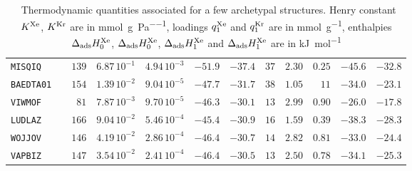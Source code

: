 \documentclass[main.tex]{subfiles}
\begin{document}
\begin{table}[hb]
\begin{tabular}{|lr|rrrrr|rrrrr|}
        \texttt{MISQIQ} & \cite{MISQIQ}        &  $139$  &  $6.87\,10^{-1}$  &  $4.94\,10^{-3}$  &  $-51.9$  &  $-37.4$  &  $ 37$  &  $2.30$  &  $0.25$  &  $-45.6$  &  $-32.8$  \\
        \texttt{BAEDTA01} & \cite{BAEDTA01}      &  $154$  &  $1.39\,10^{-2}$  &  $9.04\,10^{-5}$  &  $-47.7$  &  $-31.7$  &  $ 38$  &  $1.05$  &  $  11$  &  $-34.0$  &  $-23.1$  \\
        \texttt{VIWMOF} & \cite{VIWMOF}        &  $ 81$  &  $7.87\,10^{-3}$  &  $9.70\,10^{-5}$  &  $-46.3$  &  $-30.1$  &  $ 13$  &  $2.99$  &  $0.90$  &  $-26.0$  &  $-17.8$  \\
        \texttt{LUDLAZ} & \cite{LUDLAZ}        &  $166$  &  $9.04\,10^{-2}$  &  $5.46\,10^{-4}$  &  $-45.4$  &  $-30.9$  &  $ 16$  &  $1.59$  &  $0.39$  &  $-38.3$  &  $-28.3$  \\
        \texttt{WOJJOV} & \cite{WOJJOV}        &  $146$  &  $4.19\,10^{-2}$  &  $2.86\,10^{-4}$  &  $-46.4$  &  $-30.7$  &  $ 14$  &  $2.82$  &  $0.81$  &  $-33.0$  &  $-24.4$  \\
        \texttt{VAPBIZ} & \cite{VAPBIZ}        &  $147$  &  $3.54\,10^{-2}$  &  $2.41\,10^{-4}$  &  $-46.4$  &  $-30.5$  &  $ 13$  &  $2.50$  &  $0.78$  &  $-34.1$  &  $-25.3$  \\
    \hline
    \end{tabular}
    \caption{\ Thermodynamic quantities associated for a few archetypal structures. Henry constant $K^{\text{Xe}}$, $K^{\text{Kr}}$ are in \si{\milli\mol\per\gram\per\pascal}, loadings $q^{\text{Xe}}_{\text{1}}$ and $q^{\text{Kr}}_{\text{1}}$ are in \si{\milli\mol\per\gram}, enthalpies $\Delta_{\text{ads}}H^{\text{Xe}}_{\text{0}}$, $\Delta_{\text{ads}}H^{\text{Xe}}_{\text{0}}$, $\Delta_{\text{ads}}H^{\text{Xe}}_{\text{1}}$ and $\Delta_{\text{ads}}H^{\text{Xe}}_{\text{1}}$ are in \si{\kilo\joule\per\mol}}\label{tbl:thermo}
\end{table}
\end{document}
